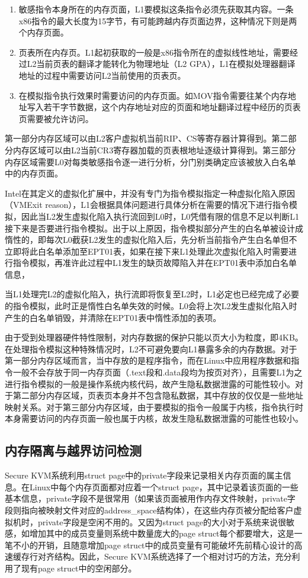 \begin{enumerate}
\item 敏感指令本身所在的内存页面，L1要模拟这条指令必须先获取其内容。一条x86指令的最大长度为15字节，有可能跨越内存页面边界，这种情况下则是两个内存页面。
\item 页表所在内存页。L1起初获取的一般是x86指令所在的虚拟线性地址，需要经过L2当前页表的翻译才能转化为物理地址（L2 GPA），L1在模拟处理器翻译地址的过程中需要访问L2当前使用的页表页。
\item 在模拟指令执行效果时需要访问的内存页面。如MOV指令需要往某个内存地址写入若干字节数据，这个内存地址对应的页面和地址翻译过程中经历的页表页需要被允许访问。
\end{enumerate}

第一部分内存区域可以由L2客户虚拟机当前RIP、CS等寄存器计算得到。第二部分内存区域可以由L2当前CR3寄存器加载的页表根地址逐级计算得到。第三部分内存区域需要L0对每类敏感指令逐一进行分析，分门别类确定应该被放入白名单中的内存页面。

Intel在其定义的虚拟化扩展中，并没有专门为指令模拟指定一种虚拟化陷入原因（VMExit reason），L1会根据具体问题进行具体分析在需要的情况下进行指令模拟，因此当L2发生虚拟化陷入执行流回到L0时，L0凭借有限的信息不足以判断L1接下来是否要进行指令模拟。出于以上原因，指令模拟部分产生的白名单被设计成惰性的，即每次L0截获L2发生的虚拟化陷入后，先分析当前指令产生白名单但不立即将此白名单添加至EPT01表，如果在接下来L1处理此次虚拟化陷入时需要进行指令模拟，再准许此过程中L1发生的缺页故障陷入并在EPT01表中添加白名单信息，

当L1处理完L2的虚拟化陷入，执行流即将恢复至L2时，L1必定也已经完成了必要的指令模拟，此时正是惰性白名单失效的时候。L0会将上次L2发生虚拟化陷入时产生的白名单销毁，并清除在EPT01表中惰性添加的表项。

由于受到处理器硬件特性限制，对内存数据的保护只能以页大小为粒度，即4KB。在处理指令模拟这种特殊情况时，L2不可避免要向L1暴露多余的内存数据。对于第一部分内存区域而言，当中存放的是程序指令，而在Linux中应用程序数据和指令一般不会存放于同一内存页面（.text段和.data段均为按页对齐），且需要L1为之进行指令模拟的一般是操作系统内核代码，故产生隐私数据泄露的可能性较小。对于第二部分内存区域，页表页本身并不包含隐私数据，其中存放的仅仅是一些地址映射关系。对于第三部分内存区域，由于要模拟的指令一般属于内核，指令执行时本身需要访问的内存页面一般也属于内核，故发生隐私数据泄露的可能性也较小。

\subsection{内存隔离与越界访问检测}
Secure KVM系统利用struct page中的private字段来记录相关内存页面的属主信息。在Linux中每个内存页面都对应着一个struct page，其中记录着该页面的一些基本信息，private字段不是很常用（如果该页面被用作内存文件映射，private字段则指向被映射文件对应的address\_space结构体），在这些内存页被分配给客户虚拟机时，private字段是空闲不用的。又因为struct page的大小对于系统来说很敏感，如增加其中的成员变量则系统中数量庞大的page struct每个都要增大，这是一笔不小的开销，且随意增加page struct中的成员变量有可能破坏先前精心设计的高速缓存行对齐结构。因此，Secure KVM系统选择了一个相对讨巧的方法，充分利用了现有page struct中的空闲部分。

